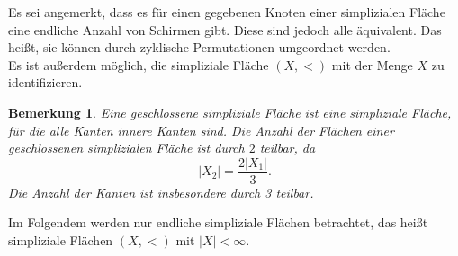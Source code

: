 \documentclass[12pt,titlepage,twoside,cleardoublepage]{article}
\theoremstyle{nummermitklammern}
\newtheorem{bemerkung}[temp]{Bemerkung}
\newtheorem{bemerkung}[zahl]{Bemerkung}
\numberwithin{equation}{section}
\begin{document}
Es sei angemerkt, dass es für einen gegebenen Knoten einer simplizialen Fläche eine endliche Anzahl von Schirmen gibt. Diese sind jedoch alle äquivalent. Das heißt, sie können durch zyklische Permutationen umgeordnet werden.\\ Es ist außerdem möglich, die simpliziale Fläche $(X,<)$ mit der Menge $X$ zu identifizieren.
\begin{bemerkung}  Eine \emph{geschlossene} simpliziale Fläche ist eine simpliziale Fläche, für die alle Kanten innere Kanten sind. Die Anzahl der Flächen einer geschlossenen simplizialen Fläche ist durch $2$ teilbar, da
\[
\vert X_{2} \vert = \frac{2\vert X_{1}\vert}{3}.
\]
Die Anzahl der Kanten ist insbesondere durch 3 teilbar.
\end{bemerkung}
Im Folgendem werden nur endliche simpliziale Flächen betrachtet, das heißt simpliziale Flächen $(X,<)$ mit $\vert X \vert < \infty$.
\end{document}
